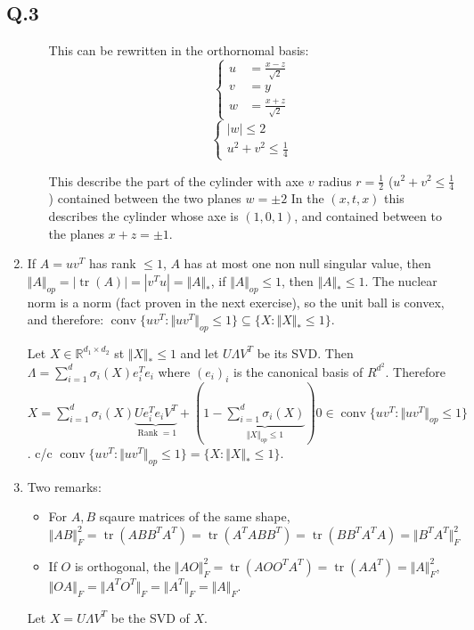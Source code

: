 \documentclass[12pt]{article}
\newcommand{\Q}[1]{\subsection*{Q.#1}}
\newenvironment{question}[1]
{\Q{#1}}{}
\DeclareMathOperator{\tr}{tr}
\DeclareMathOperator{\rank}{Rank}
\DeclareMathOperator{\conv}{conv}
\begin{document}
\begin{question}{3}
\begin{enumerate}
\begin{enumerate}
      This can be rewritten in the orthornomal basis:
      \[ \left\{ \begin{array}{cc} u &= \frac{x- z}{\sqrt 2}\\ v &= y \\ w &= \frac{x + z}{\sqrt 2} \end{array} \right. \]
      \[ \left\{ \begin{array}{c} |w| \le 2 \\ u^2 + v^2 \le \frac14 \end{array} \right. \]
      
      This describe the part of the cylinder with axe $v$ radius $r = \frac12$ ($u^2 + v^2 \le \frac14$)  contained between the two planes $w = \pm 2$
      In the $(x, t, x)$ this describes the cylinder whose axe is $(1, 0, 1)$, and contained between to the planes $x+z = \pm 1$.
      
    \end{enumerate}

  \item If $A = uv^T$ has rank $\le 1$, $A$ has at most one non null singular value, then $\Vert A\Vert _{op} = |\tr(A)| = |v^Tu| = \Vert A\Vert _*$, if $\Vert A\Vert _{op} \le 1$, then $\Vert A\Vert _{*} \le 1$.
    The nuclear norm is a norm (fact proven in the next exercise), so the unit ball is convex, and therefore:
    $\conv \{ uv^T : \Vert uv^T\Vert _{op} \le 1 \} \subseteq \{ X : \Vert X\Vert _{*} \le  1\}$.

    Let $X \in \mathbb R^{d_1 \times d_2}$ st $\Vert X\Vert _* \le 1$ and let $U\Lambda V^T$ be its SVD. Then $\Lambda = \sum_{i=1}^d \sigma_i(X) e_i^Te_i$ where $(e_i)_i$ is the canonical basis of $R^{d^2}$.
    Therefore $X = \sum_{i=1}^d \sigma_i(X) \underbrace{Ue_i^Te_iV^T}_{\rank =1} + (1 - \underbrace{\sum_{i=1}^d \sigma_i(X)}_{\Vert X\Vert _{op} \le 1}) 0 \in \conv \{ uv^T : \Vert uv^T\Vert _{op} \le 1 \}  $.
    c/c     $\conv \{ uv^T : \Vert uv^T\Vert _{op} \le 1 \} = \{ X : \Vert X\Vert _{*} \le  1\}$.
  \item 
    Two remarks:
    \begin{itemize}
    \item For $A, B$ sqaure matrices of the same shape, $\Vert AB\Vert _F^2 = \tr(ABB^TA^T) = \tr(A^TA BB^T) =  \tr(BB^T A^TA) = \Vert B^TA^T\Vert _F^2$
    \item If $O$ is orthogonal, the $\Vert AO\Vert _F^2 = \tr(AOO^TA^T) = \tr(AA^T) = \Vert A\Vert _F^2$, $\Vert OA\Vert _F = \Vert A^TO^T\Vert _F = \Vert A^T\Vert _F = \Vert A\Vert _F$.
    \end{itemize}
    Let $X = U\Lambda V^T$ be the SVD of $X$.
    

\end{enumerate}
\end{question}
\end{document}
